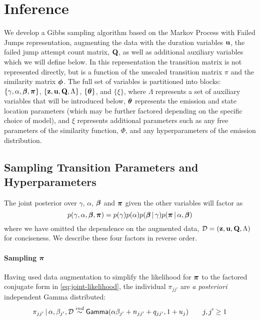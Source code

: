 \section{Inference}
\label{sec:inference}

We develop a Gibbs sampling algorithm based on the Markov Process with
Failed Jumps representation, augmenting the data with the duration
variables $\mathbf{u}$, the failed jump attempt count matrix, $\mathbf{Q}$, as well
as additional auxiliary variables which we will define below.
In this representation the transition matrix is not represented
directly, but is a function of the unscaled transition matrix $\pi$
and the similarity matrix $\boldsymbol{\phi}$.  The full set of variables is
partitioned into blocks: $\{\gamma, \alpha, \boldsymbol{\beta}, \boldsymbol{\pi}\}$,
$\{\mathbf{z}, \mathbf{u}, \mathbf{Q}, \Lambda\}$, $\{\boldsymbol{\theta}\}$, and $\{\xi\}$, where $\Lambda$
represents a set of auxiliary variables that will be introduced
below, $\boldsymbol{\theta}$ represents the emission and state location
parameters (which may be further factored depending on the specific
choice of model), and $\xi$ represents additional
parameters such as any free parameters of the similarity function,
$\Phi$, and any hyperparameters of the emission distribution.


\subsection{Sampling Transition Parameters and Hyperparameters}

The joint posterior over $\gamma$, $\alpha$, $\boldsymbol{\beta}$ and $\boldsymbol{\pi}$
given the other variables will factor as
\begin{equation}
  \label{eq:46}
  p(\gamma, \alpha, \boldsymbol{\beta}, \boldsymbol{\pi}) = p(\gamma) p(\alpha) p(\boldsymbol{\beta} \, \vert \, \gamma) p(\boldsymbol{\pi}
  \, \vert \, \alpha, \boldsymbol{\beta})
\end{equation}
where we have omitted the dependence on the augmented data,
$\mathcal{D} = (\mathbf{z}, \mathbf{u}, \mathbf{Q}, \Lambda)$ for conciseness.  
We describe these four factors in reverse order.

\paragraph{Sampling \texorpdfstring{$\boldsymbol{\pi}$}{pi}} 
Having used data augmentation to simplify the likelihood for $\boldsymbol{\pi}$ to
the factored conjugate form in \eqref{eq:joint-likelihood}, the individual
$\pi_{jj'}$ are {\it a posteriori} independent Gamma distributed:
\begin{equation}
\pi_{jj'} \, \vert \, \alpha, \beta_{j'}, \mathcal{D} \stackrel{ind}{\sim}
\mathsf{Gamma}(\alpha\beta_{j'} + n_{jj'} + q_{jj'},1 + u_j) \qquad j,j' \geq 1
\end{equation}

